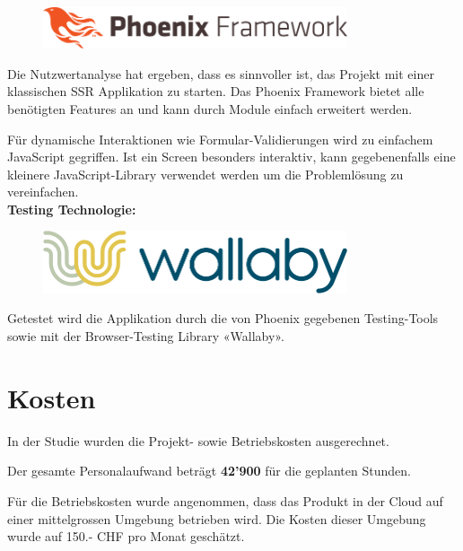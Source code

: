 \begin{figure}[!htb]
  \centering
  \includegraphics[width=0.8\textwidth]{figures/phoenix.png}
\end{figure}

\noindent
Die Nutzwertanalyse hat ergeben, dass es sinnvoller ist, das Projekt mit
einer klassischen SSR Applikation zu starten. Das Phoenix Framework bietet alle
benötigten Features an und kann durch Module einfach erweitert werden.

Für dynamische Interaktionen wie Formular-Validierungen wird zu einfachem
JavaScript gegriffen. Ist ein Screen besonders interaktiv, kann gegebenenfalls
eine kleinere JavaScript-Library verwendet werden um die Problemlösung zu
vereinfachen.\\

\textbf{Testing Technologie:}

\begin{figure}[!htb]
  \centering
  \includegraphics[width=0.8\textwidth]{figures/wallaby.png}
\end{figure}

\noindent
Getestet wird die Applikation durch die von Phoenix gegebenen Testing-Tools
sowie mit der Browser-Testing Library «Wallaby».

\clearpage
\section{Kosten}\label{projektauftragkosten}

In der Studie wurden die Projekt- sowie Betriebskosten ausgerechnet.

Der gesamte Personalaufwand beträgt \textbf{42'900} für die geplanten Stunden.



Für die Betriebskosten wurde angenommen, dass das Produkt in der Cloud auf
einer mittelgrossen Umgebung betrieben wird. Die Kosten dieser Umgebung wurde
auf 150.- CHF pro Monat geschätzt.

